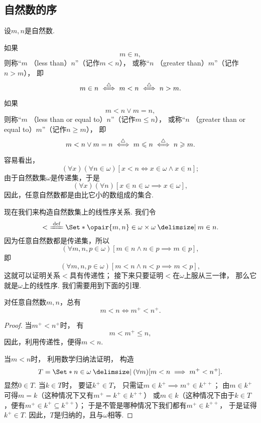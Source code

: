 \subsection{自然数的序}
\begin{definition}
设\(m,n\)是自然数.

如果\[
	m \in n,
\]
则称“\(m\) （less than）\(n\)”（记作\(m < n\)），
或称“\(n\) （greater than）\(m\)”（记作\(n > m\)），
即\[
	m \in n
	\overset{\triangle}{\iff} m < n
	\overset{\triangle}{\iff} n > m.
\]

如果\[
	m < n \lor m = n,
\]
则称“\(m\) （less than or equal to）\(n\)”（记作\(m \leqslant n\)），
或称“\(n\) （greater than or equal to）\(m\)”（记作\(n \geqslant m\)），
即\[
	m < n \lor m = n
	\overset{\triangle}{\iff} m \leqslant n
	\overset{\triangle}{\iff} n \geqslant m.
\]
\end{definition}

容易看出，\[
	(\forall x)(\forall n\in\omega)[
		x < n
		\iff
		x \in \omega \land x \in n
	];
\]
由于自然数集\(\omega\)是传递集，于是\[
	(\forall x)(\forall n)[x \in n \in \omega \implies x \in \omega],
\]
因此，任意自然数都是由比它小的数组成的集合.

现在我们来构造自然数集上的线性序关系.
我们令\[
	<\ \defeq \Set*{
		\opair{m,n} \in \omega \times \omega
		\given
		m \in n
	}.
\]
因为任意自然数都是传递集，所以\[
	(\forall m,n,p \in \omega)[
		m \in n \land n \in p
		\implies
		m \in p
	],
\]
即\[
	(\forall m,n,p \in \omega)[
		m < n \land n < p
		\implies
		m < p
	],
\]
这就可以证明关系\(<\)具有传递性；
接下来只要证明\(<\)在\(\omega\)上服从三一律，
那么它就是\(\omega\)上的线性序.
我们需要用到下面的引理.

\begin{lemma}\label{theorem:集合论.自然数的线性序.引理1}
对任意自然数\(m,n\)，总有\[
	m < n
	\iff
	m^+ < n^+.
\]
\begin{proof}
当\(m^+ < n^+\)时，
有\[
	m < m^+ \leqslant n,
\]
因此，利用传递性，便得\(m < n\).

当\(m < n\)时，
利用数学归纳法证明，
构造\[
	T = \Set*{
		n \in \omega
		\given
		(\forall m)[m < n \implies m^+ < n^+]
	}.
\]
显然\(0 \in T\).
当\(k \in T\)时，
要证\(k^+ \in T\)，
只需证\(m \in k^+ \implies m^+ \in k^{++}\)；
由\(m \in k^+\)可得\(m = k\)（这种情况下又有\(m^+ = k^+ \in k^{++}\)）
或\(m \in k\)（这种情况下由于\(k \in T\)，便有\(m^+ \in k^+ \subseteq k^{++}\)）；
于是不管是哪种情况下我们都有\(m^+ \in k^{++}\)，
于是证得\(k^+ \in T\).
因此，\(T\)是归纳的，且与\(\omega\)相等.
\end{proof}
\end{lemma}

